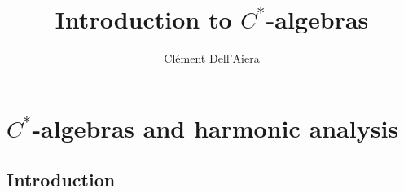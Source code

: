 \documentclass[a4paper]{book}
\title{Introduction to $C^*$-algebras}
\date{} %
\author{ Clément Dell'Aiera }
\begin{document}
  

\maketitle
\tableofcontents

\part{$C^*$-algebras and harmonic analysis}
\chapter{Introduction}

\end{document}
